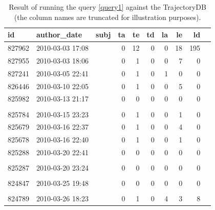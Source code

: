 \documentclass[a4paper,10pt]{article}
\numberwithin{equation}{subsection}
\begin{document}
\begin{table}[hb]
\noindent\begin{minipage}{\textwidth}
  \tiny
  \caption{Result of running the query \ref{query1} against the TrajectoryDB (the column names are truncated for illustration purposes). }
  \begin{tabularx}{\textwidth}{ | l | l | X | r | r | r | r | r | r | r |}
  \hline           
id & author\_date & subj & ta & te & td & la & le & ld\\ 
\hline           
827962 & 2010-03-03 17:08 & \verb7sparc64: Kill off old sys_perfctr system call and state.7 & 0 & 12 & 0 & 0 & 18 & 195\\ 
827955 & 2010-03-03 18:06 & \verb1sparc64: Make prom entry spinlock NMI safe.1 & 0 & 1 & 0 & 0 & 7 & 0\\ 
827241 & 2010-03-05 22:41 & \verb1timbgpio: fix build1 & 0 & 1 & 0 & 1 & 0 & 0\\ 
826446 & 2010-03-10 22:05 & \verb1uartlite: Fix build on sparc.1 & 0 & 1 & 0 & 0 & 5 & 0\\ 
825982 & 2010-03-13 21:17 & \verb1Merge branch 'master' of1 & 0 & 0 & 0 & 0 & 0 & 0\\
& & \verb1git://git.kernel.org/pub/scm/linux/kernel/git/linville/wireless-2.61 &  &  &  &  &  & \\  
825784 & 2010-03-15 23:23 & \verb7e100: Fix ring parameter change handling regression.7 & 0 & 1 & 0 & 0 & 1 & 0\\ 
825679 & 2010-03-16 22:37 & \verb1bridge: Make first arg to deliver_clone const.1 & 0 & 1 & 0 & 0 & 4 & 0\\ 
825678 & 2010-03-16 22:40 & \verb7sunxvr1000: Add missing FB=y depenency.7 & 0 & 1 & 0 & 0 & 1 & 0\\ 
825288 & 2010-03-20 22:41 & \verb1Merge branch 'vhost' of 1 & 0 & 0 & 0 & 0 & 0 & 0\\
& & \verb1git://git.kernel.org/pub/scm/linux/kernel/git/mst/vhost1 &  &  &  &  &  & \\  
825287 & 2010-03-20 23:24 & \verb1Merge branch 'master' of 1 & 0 & 0 & 0 & 0 & 0 & 0\\ 
& & \verb1master.kernel.org:/pub/scm/linux/kernel/git/davem/net-2.61 &  &  &  &  &  & \\  
824847 & 2010-03-25 19:48 & \verb1Merge branch 'master' of 1 & 0 & 0 & 0 & 0 & 0 & 0\\ 
& & \verb1git://git.kernel.org/pub/scm/linux/kernel/git/kaber/nf-2.61 &  &  &  &  &  & \\  
824789 & 2010-03-26 18:23 & \verb7Revert r8169: enable 64-bit DMA by default for PCI Express devices (v2)"7 & 0 & 1 & 0 & 4 & 3 & 8\\ 

\end{tabularx}
\end{minipage}
\end{table}
\end{document}
